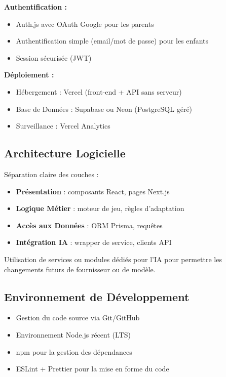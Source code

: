 \documentclass[12pt,a4paper]{article}
\begin{document}
\textbf{Authentification :}
\begin{itemize}
    \item Auth.js avec OAuth Google pour les parents
    \item Authentification simple (email/mot de passe) pour les enfants
    \item Session sécurisée (JWT)
\end{itemize}

\textbf{Déploiement :}
\begin{itemize}
    \item Hébergement : Vercel (front-end + API sans serveur)
    \item Base de Données : Supabase ou Neon (PostgreSQL géré)
    \item Surveillance : Vercel Analytics
\end{itemize}

\subsection{Architecture Logicielle}

Séparation claire des couches :
\begin{itemize}
    \item \textbf{Présentation} : composants React, pages Next.js
    \item \textbf{Logique Métier} : moteur de jeu, règles d'adaptation
    \item \textbf{Accès aux Données} : ORM Prisma, requêtes
    \item \textbf{Intégration IA} : wrapper de service, clients API
\end{itemize}

Utilisation de services ou modules dédiés pour l'IA pour permettre les changements futurs de fournisseur ou de modèle.

\subsection{Environnement de Développement}

\begin{itemize}
    \item Gestion du code source via Git/GitHub
    \item Environnement Node.js récent (LTS)
    \item npm pour la gestion des dépendances
    \item ESLint + Prettier pour la mise en forme du code
\end{itemize}
\end{document}
